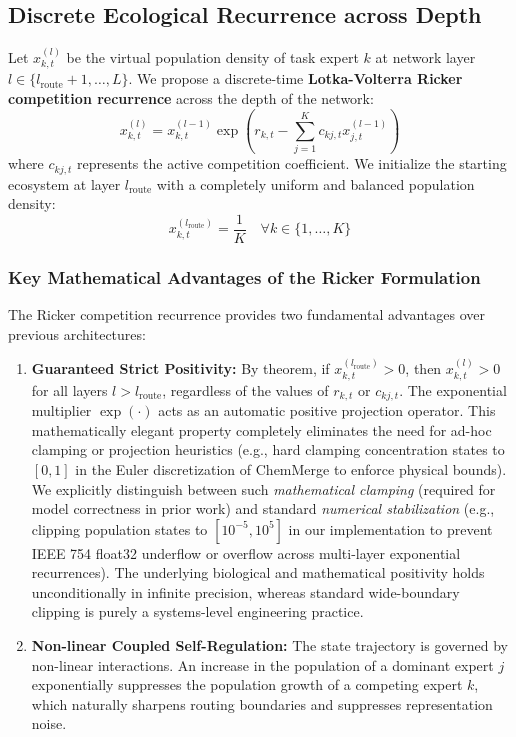 \subsection{Discrete Ecological Recurrence across Depth}
Let $x_{k, t}^{(l)}$ be the virtual population density of task expert $k$ at network layer $l \in \{l_{\text{route}}+1, \dots, L\}$. We propose a discrete-time \textbf{Lotka-Volterra Ricker competition recurrence} across the depth of the network:
\begin{equation}
    \label{eq:ricker_recurrence}
    x_{k, t}^{(l)} = x_{k, t}^{(l-1)} \exp\left( r_{k, t} - \sum_{j=1}^K c_{kj, t} x_{j, t}^{(l-1)} \right)
\end{equation}
where $c_{kj, t}$ represents the active competition coefficient. We initialize the starting ecosystem at layer $l_{\text{route}}$ with a completely uniform and balanced population density:
\begin{equation}
    x_{k, t}^{(l_{\text{route}})} = \frac{1}{K} \quad \forall k \in \{1, \dots, K\}
\end{equation}

\subsubsection{Key Mathematical Advantages of the Ricker Formulation}
The Ricker competition recurrence \cite{ricker1954stock} provides two fundamental advantages over previous architectures:
\begin{enumerate}
    \item \textbf{Guaranteed Strict Positivity:} By theorem, if $x_{k, t}^{(l_{\text{route}})} > 0$, then $x_{k, t}^{(l)} > 0$ for all layers $l > l_{\text{route}}$, regardless of the values of $r_{k, t}$ or $c_{kj, t}$. The exponential multiplier $\exp(\cdot)$ acts as an automatic positive projection operator. This mathematically elegant property completely eliminates the need for ad-hoc clamping or projection heuristics (e.g., hard clamping concentration states to $[0, 1]$ in the Euler discretization of ChemMerge \cite{chemmerge} to enforce physical bounds). We explicitly distinguish between such \emph{mathematical clamping} (required for model correctness in prior work) and standard \emph{numerical stabilization} (e.g., clipping population states to $[10^{-5}, 10^5]$ in our implementation to prevent IEEE 754 float32 underflow or overflow across multi-layer exponential recurrences). The underlying biological and mathematical positivity holds unconditionally in infinite precision, whereas standard wide-boundary clipping is purely a systems-level engineering practice.
    \item \textbf{Non-linear Coupled Self-Regulation:} The state trajectory is governed by non-linear interactions. An increase in the population of a dominant expert $j$ exponentially suppresses the population growth of a competing expert $k$, which naturally sharpens routing boundaries and suppresses representation noise.
\end{enumerate}

